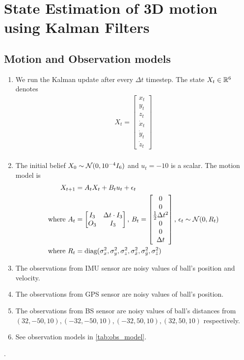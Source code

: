 \section{State Estimation of 3D motion using Kalman Filters}
\subsection{Motion and Observation models}
\begin{enumerate}
\item 
We run the Kalman update after every $\Delta t$ timestep. The state $X_t \in \mathbb{R}^6$ denotes
\begin{align*}
X_t = \begin{bmatrix} x_t \\ y_t \\ z_t \\ \dot{x}_t \\ \dot{y}_t \\ \dot{z}_t \end{bmatrix}\\
\end{align*}
\item The initial belief $X_0 \sim \mathcal{N}(0, 10^{-4} I_6)$ and $u_t = -10$ is a scalar. The motion model is
\begin{align*}
X_{t + 1} &= A_t X_{t} + B_t u_t + \epsilon_t\\
\text{where }
A_t &= \begin{bmatrix} 
I_3  & \Delta t \cdot I_3 \\ 
O_3 & I_3 \\ 
\end{bmatrix}
\text{, }
B_t = \begin{bmatrix} 
0 \\
0 \\
\frac{1}{2} \Delta t^2 \\
0 \\
0 \\
\Delta t 
\end{bmatrix}
\text{, }
\epsilon_t \sim \mathcal{N}(0, R_t)\\
\text{where }
R_t &= \text{diag}(\sigma_x^2, \sigma_y^2, \sigma_z^2, \sigma_{\dot{x}}^2, \sigma_{\dot{y}}^2, \sigma_{\dot{z}}^2)
\end{align*}
\item The observations from IMU sensor are noisy  values of ball's position and velocity.

\item The observations from GPS sensor are noisy  values of ball's position.

\item The observations from BS sensor are noisy  values of ball's distances from $(32, -50, 10), (-32, -50, 10), (-32, 50, 10), (32, 50, 10)$ respectively. 

\item See observation models in \autoref{tab:obs_model}.
\end{enumerate}.

